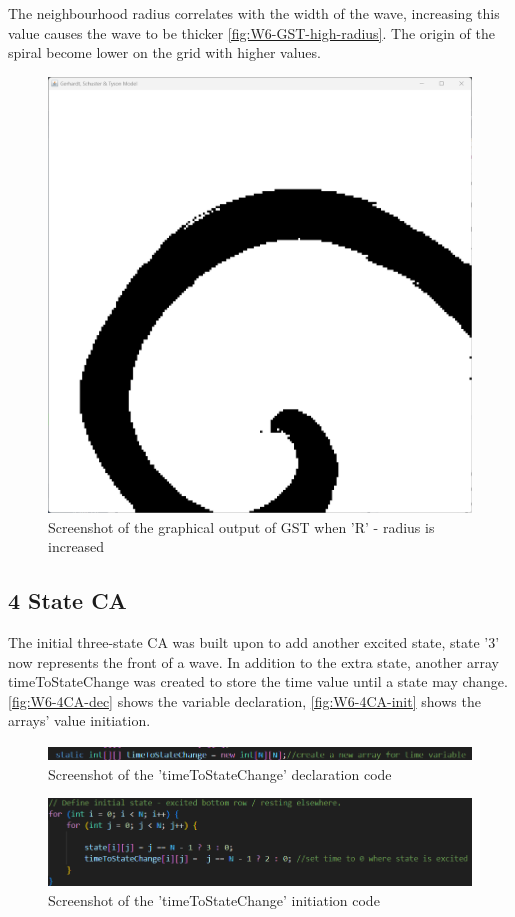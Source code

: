 The neighbourhood radius correlates with the width of the wave, increasing this value causes the wave to be thicker \autoref{fig:W6-GST-high-radius}. The origin of the spiral become lower on the grid with higher values.

\begin{figure}[H] 
    \centering
    \includegraphics[width=0.49\columnwidth]{Figures/Week 6/GST-Large-Radius.png}
    \caption{Screenshot of the graphical output of GST when 'R' - radius is increased}
    \label{fig:W6-GST-high-radius}
\end{figure}
\newpage
\subsection{4 State CA}
The initial three-state CA was built upon to add another excited state, state '3' now represents the front of a wave. In addition to the extra state, another array timeToStateChange was created to store the time value until a state may change. \autoref{fig:W6-4CA-dec} shows the variable declaration, \autoref{fig:W6-4CA-init} shows the arrays' value initiation.


\begin{figure}[H] 
    \centering
    \includegraphics[width=1\columnwidth]{Figures/Week 6/4stateCA-time-delaration.png}
    \caption{Screenshot of the 'timeToStateChange' declaration code}
    \label{fig:W6-4CA-dec}
\end{figure}

\begin{figure}[H] 
    \centering
    \includegraphics[width=1\columnwidth]{Figures/Week 6/4stateCA-time-values-init.png}
    \caption{Screenshot of the 'timeToStateChange' initiation code}
    \label{fig:W6-4CA-init}
\end{figure}


